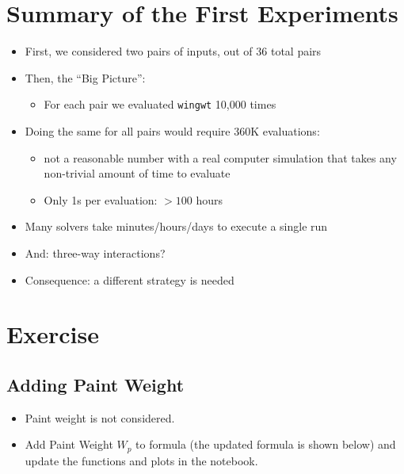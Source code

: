 \documentclass[
  letterpaper,
  DIV=11,
  numbers=noendperiod]{scrreprt}
\providecommand{\tightlist}{%
  \setlength{\itemsep}{0pt}\setlength{\parskip}{0pt}}\usepackage{longtable,booktabs,array}
\begin{document}
\section{Summary of the First
Experiments}\label{summary-of-the-first-experiments}

\begin{itemize}
\tightlist
\item
  First, we considered two pairs of inputs, out of 36 total pairs
\item
  Then, the ``Big Picture'':

  \begin{itemize}
  \tightlist
  \item
    For each pair we evaluated \texttt{wingwt} 10,000 times
  \end{itemize}
\item
  Doing the same for all pairs would require 360K evaluations:

  \begin{itemize}
  \tightlist
  \item
    not a reasonable number with a real computer simulation that takes
    any non-trivial amount of time to evaluate
  \item
    Only 1s per evaluation: \(>100\) hours
  \end{itemize}
\item
  Many solvers take minutes/hours/days to execute a single run
\item
  And: three-way interactions?
\item
  Consequence: a different strategy is needed
\end{itemize}

\section{Exercise}\label{exercise}

\subsection{Adding Paint Weight}\label{adding-paint-weight}

\begin{itemize}
\tightlist
\item
  Paint weight is not considered.
\item
  Add Paint Weight \(W_p\) to formula (the updated formula is shown
  below) and update the functions and plots in the notebook.
\end{itemize}
\end{document}
